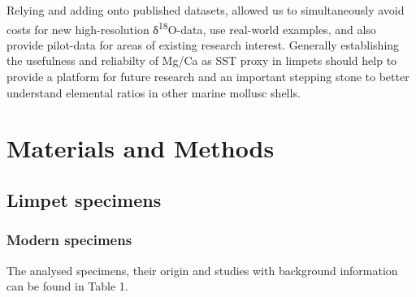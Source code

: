 \documentclass[
  authoryear,
  preprint,
  3p]{elsarticle}
\begin{document}
Relying and adding onto published datasets, allowed us to simultaneously
avoid costs for new high-resolution δ\textsuperscript{18}O-data, use
real-world examples, and also provide pilot-data for areas of existing
research interest. Generally establishing the usefulness and reliabilty
of Mg/Ca as SST proxy in limpets should help to provide a platform for
future research and an important stepping stone to better understand
elemental ratios in other marine mollusc shells.

\section{Materials and Methods}\label{Methods}

\subsection{Limpet specimens}\label{limpet-specimens}

\subsubsection{Modern specimens}\label{modern-specimens}

The analysed specimens, their origin and studies with background
information can be found in Table 1.
\end{document}

